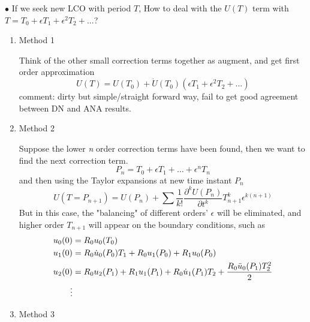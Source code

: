 \documentclass{article}
\begin{document}
 $\bullet$ If we seek new LCO with period $T$, How to deal with the $U(T)$ term with $T=T_0+\epsilon T_1 +\epsilon^2 T_2+...$?\\
 \begin{enumerate}
     \item Method 1
     
     Think of the other small correction terms together as augment, and get first order approximation
     $$U(T)=U(T_0)+\dot{U}(T_0)(\epsilon T_1+\epsilon^2 T_2+...)$$
     comment: dirty but simple/straight forward way, fail to get good agreement between DN and ANA results.
     \item Method 2
     
     Suppose the lower \emph{n} order correction terms have been found, then we want to find the next correction term. $$P_n=T_0+\epsilon T_1 + \ldots +\epsilon ^n T_n$$
     and then using the Taylor expansions at new time instant $P_n$ $$ U(T=P_{n+1})=U(P_n)+\sum{\frac{1}{k!} \frac{\partial^k U(P_n)}{\partial t^k} T_{n+1}^{k} \epsilon^{k(n+1)}} $$
     But in this case, the "balancing" of  different orders' $\boxed{\epsilon}$ will be eliminated, and higher order $T_{n+1}$ will appear on the boundary conditions, such as
     \begin{align*}
         u_0(0)&=R_0 u_0(T_0)\\
         u_1(0)&=R_0 \dot{u}_0(P_0)T_1+R_0 u_1(P_0)+R_1 u_0(P_0)\\
         u_2(0)&=R_0 u_2(P_1)+R_1 u_1(P_1) +R_0 \dot{u}_1(P_1)T_2+\frac{R_0\ddot{u}_0(P_1)T_2^2}{2}\\
         \centering \vdots
     \end{align*}
     \item Method 3
     

\end{enumerate}
\end{document}
